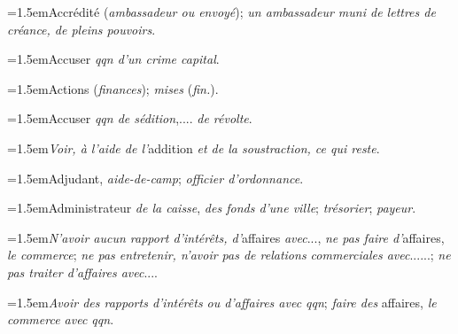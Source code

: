\par{\dictfontsize\hangindent=1.5em\noindent Accrédité (\textit{ambassadeur ou envoyé}); \textit{un ambassadeur muni de lettres de créance, de pleins pouvoirs}. \par}
\par{\dictfontsize\hangindent=1.5em\noindent Accuser \textit{qqn d’un crime capital}. \par}
\par{\dictfontsize\hangindent=1.5em\noindent Actions (\textit{finances}); \textit{mises} (\textit{fin.}). \par}
\par{\dictfontsize\hangindent=1.5em\noindent Accuser \textit{qqn de sédition},.... \textit{de révolte}. \par}
\par{\dictfontsize\hangindent=1.5em\noindent \textit{Voir, à l’aide de l’}addition \textit{et de la soustraction, ce qui reste}. \par}
\par{\dictfontsize\hangindent=1.5em\noindent Adjudant, \textit{aide-de-camp}; \textit{officier d’ordonnance}. \par}
\par{\dictfontsize\hangindent=1.5em\noindent Administrateur \textit{de la caisse}, \textit{des fonds d’une ville}; \textit{trésorier}; \textit{payeur}. \par}
\par{\dictfontsize\hangindent=1.5em\noindent \textit{N’avoir aucun rapport d’intérêts, d’}affaires \textit{avec}..., \textit{ne pas faire d’}affaires, \textit{le commerce}; \textit{ne pas entretenir, n’avoir pas de relations commerciales avec}......; \textit{ne pas traiter d’affaires avec}.... \par}
\par{\dictfontsize\hangindent=1.5em\noindent \textit{Avoir des rapports d’intérêts ou d’affaires avec qqn}; \textit{faire des} affaires, \textit{le commerce avec qqn}. \par}
